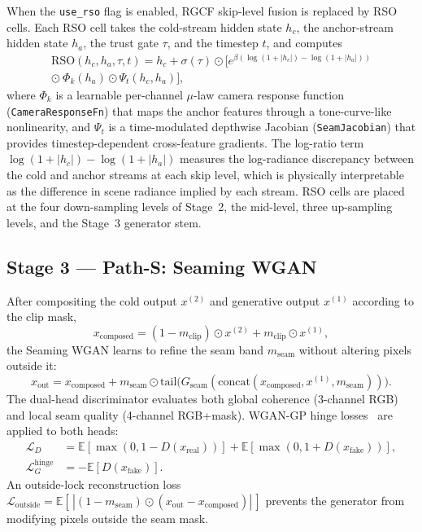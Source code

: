 \documentclass[10pt,twocolumn,letterpaper]{article}
\begin{document}
When the \texttt{use\_rso} flag is enabled, RGCF skip-level fusion is replaced by RSO cells. Each RSO cell takes the cold-stream hidden state $h_c$, the anchor-stream hidden state $h_a$, the trust gate $\tau$, and the timestep $t$, and computes
\begin{equation}
\begin{split}
\mathrm{RSO}(h_c, h_a, \tau, t) = h_c + \sigma(\tau) \odot \Big[
  e^{\beta(\log(1+|h_c|) - \log(1+|h_a|))} \\
  \odot\ \Phi_k(h_a) \odot \Psi_t(h_c, h_a)
\Big],
\end{split}
\label{eq:rso}
\end{equation}
where $\Phi_k$ is a learnable per-channel $\mu$-law camera response function (\texttt{CameraResponseFn}) that maps the anchor features through a tone-curve-like nonlinearity, and $\Psi_t$ is a time-modulated depthwise Jacobian (\texttt{SeamJacobian}) that provides timestep-dependent cross-feature gradients. The log-ratio term $\log(1+|h_c|) - \log(1+|h_a|)$ measures the log-radiance discrepancy between the cold and anchor streams at each skip level, which is physically interpretable as the difference in scene radiance implied by each stream. RSO cells are placed at the four down-sampling levels of Stage~2, the mid-level, three up-sampling levels, and the Stage~3 generator stem.

\subsection{Stage 3 --- Path-S: Seaming WGAN}

After compositing the cold output $x^{(2)}$ and generative output $x^{(1)}$ according to the clip mask,
\begin{equation}
x_{\mathrm{composed}} = (1-m_{\mathrm{clip}}) \odot x^{(2)} + m_{\mathrm{clip}} \odot x^{(1)},
\label{eq:compose}
\end{equation}
the Seaming WGAN learns to refine the seam band $m_{\mathrm{seam}}$ without altering pixels outside it:
\begin{equation}
x_{\mathrm{out}} = x_{\mathrm{composed}} + m_{\mathrm{seam}} \odot \mathrm{tail}\big(G_{\mathrm{seam}}(\mathrm{concat}(x_{\mathrm{composed}}, x^{(1)}, m_{\mathrm{seam}}))\big).
\label{eq:seam-out}
\end{equation}
The dual-head discriminator evaluates both global coherence (3-channel RGB) and local seam quality (4-channel RGB+mask). WGAN-GP hinge losses~\cite{wgangp} are applied to both heads:
\begin{align}
\mathcal{L}_D &= \mathbb{E}[\max(0,1-D(x_{\mathrm{real}}))] + \mathbb{E}[\max(0,1+D(x_{\mathrm{fake}}))], \\
\mathcal{L}_G^{\mathrm{hinge}} &= -\mathbb{E}[D(x_{\mathrm{fake}})].
\end{align}
An outside-lock reconstruction loss $\mathcal{L}_{\mathrm{outside}} = \mathbb{E}[\,|(1-m_{\mathrm{seam}}) \odot (x_{\mathrm{out}} - x_{\mathrm{composed}})|\,]$ prevents the generator from modifying pixels outside the seam mask.
\end{document}
